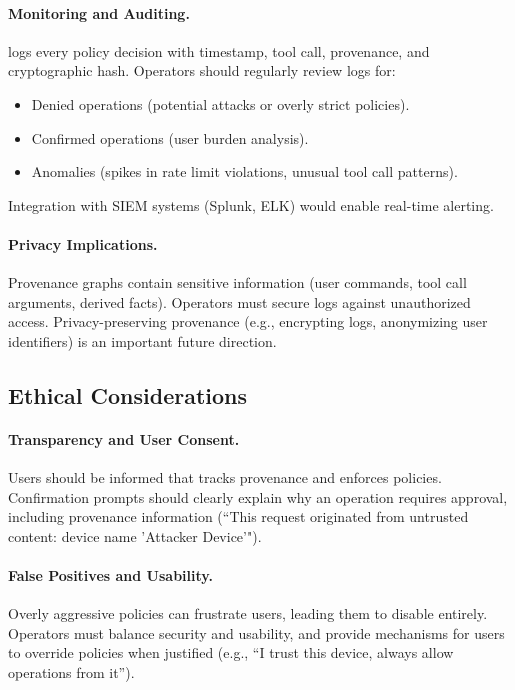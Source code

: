 \paragraph{Monitoring and Auditing.}
\sys{} logs every policy decision with timestamp, tool call, provenance, and cryptographic hash. Operators
should regularly review logs for:
\begin{itemize}[leftmargin=1.2em]
  \item Denied operations (potential attacks or overly strict policies).
  \item Confirmed operations (user burden analysis).
  \item Anomalies (spikes in rate limit violations, unusual tool call patterns).
\end{itemize}

Integration with SIEM systems (Splunk, ELK) would enable real-time alerting.

\paragraph{Privacy Implications.}
Provenance graphs contain sensitive information (user commands, tool call arguments, derived facts). Operators
must secure logs against unauthorized access. Privacy-preserving provenance (e.g., encrypting logs, anonymizing
user identifiers) is an important future direction.

\subsection{Ethical Considerations}

\paragraph{Transparency and User Consent.}
Users should be informed that \sys{} tracks provenance and enforces policies. Confirmation prompts should
clearly explain why an operation requires approval, including provenance information (``This request originated
from untrusted content: device name 'Attacker Device'").

\paragraph{False Positives and Usability.}
Overly aggressive policies can frustrate users, leading them to disable \sys{} entirely. Operators must balance
security and usability, and provide mechanisms for users to override policies when justified (e.g., ``I trust
this device, always allow operations from it'').

